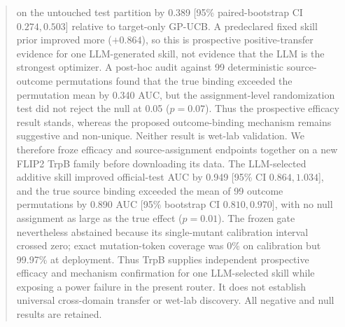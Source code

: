 \documentclass[pdflatex,sn-nature]{sn-jnl}
\begin{document}
\begin{abstract}
on the untouched test partition by 0.389 [95\% paired-bootstrap CI
$0.274,0.503$] relative to target-only GP-UCB. A predeclared fixed skill prior
improved more ($+0.864$), so this is prospective positive-transfer evidence for
one LLM-generated skill, not evidence that the LLM is the strongest optimizer.
A post-hoc audit against 99 deterministic source-outcome permutations found
that the true binding exceeded the permutation mean by 0.340 AUC, but the
assignment-level randomization test did not reject the null at 0.05
($p=0.07$). Thus the prospective efficacy result stands, whereas the proposed
outcome-binding mechanism remains suggestive and non-unique. Neither result is
wet-lab validation. We therefore froze efficacy and source-assignment endpoints
together on a new FLIP2 TrpB family before downloading its data. The
LLM-selected additive skill improved official-test AUC by 0.949 [95\% CI
$0.864,1.034$], and the true source binding exceeded the mean of 99 outcome
permutations by 0.890 AUC [95\% bootstrap CI $0.810,0.970$], with no null
assignment as large as the true effect ($p=0.01$). The frozen gate nevertheless
abstained because its single-mutant calibration interval crossed zero; exact
mutation-token coverage was 0\% on calibration but 99.97\% at deployment.
Thus TrpB supplies independent prospective efficacy and mechanism confirmation
for one LLM-selected skill while exposing a power failure in the present
router. It does not establish universal cross-domain transfer or wet-lab
discovery. All negative and null results are retained.
\end{abstract}
\end{document}
